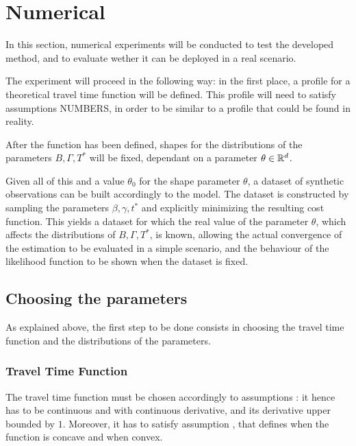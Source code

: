 \section{Numerical}

In this section, numerical experiments will be conducted to test the developed method,
and to evaluate wether it can be deployed in a real scenario.

The experiment will proceed in the following way:
in the first place, a profile for a theoretical travel time function will be defined.
This profile will need to satisfy assumptions NUMBERS,
in order to be similar to a profile that could be found in reality.

After the function has been defined,
shapes for the distributions of the parameters \(B, \Gamma, T^*\) will be fixed,
dependant on a parameter \(\theta \in \mathbb{R}^d\).

Given all of this and a value \(\theta_0\) for the shape parameter \(\theta\),
a dataset of synthetic observations can be built accordingly to the model.
The dataset is constructed by sampling the parameters \(\beta, \gamma, t^*\) and explicitly minimizing the resulting cost function.
This yields a dataset for which the real value of the parameter \(\theta\),
which affects the distributions of \(B, \Gamma, T^*\), is known,
allowing the actual convergence of the estimation to be evaluated in a simple scenario,
and the behaviour of the likelihood function to be shown when the dataset is fixed.

\subsection{Choosing the parameters}

As explained above,
the first step to be done consists in choosing the travel time function and the distributions of the parameters.

\subsubsection{Travel Time Function}

The travel time function must be chosen accordingly to assumptions :
it hence has to be continuous and with continuous derivative,
and its derivative upper bounded by \(1\).
Moreover, it has to satisfy assumption ,
that defines when the function is concave and when convex.

